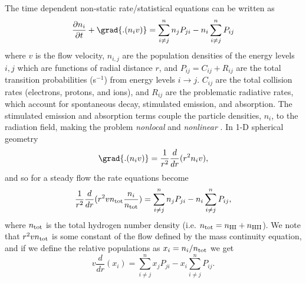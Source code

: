 The time dependent non-static rate/statistical equations can be written as
\begin{equation}
\frac{\partial n_{i}}{\partial t}+\grad{.(n_{i}v)} = \sum_{i\neq j}^n n_{j}P_{ji} - n_{i}\sum_{i\neq j}^n P_{ij} 
\end{equation}
where $v$ is the flow velocity, $n_{i,j}$ are the population densities of the energy levels $i,j$ which are functions of radial distance $r$, and  $P_{ij}=C_{ij}+R_{ij}$ are the total transition probabilities (s$^{-1}$) from energy levels $i \rightarrow j$. $C_{ij}$ are the total collision rates (electrons, protons, and ions), and $R_{ij}$ are the problematic radiative rates, which account for spontaneous decay, stimulated emission, and absorption. The stimulated emission and absorption terms couple the particle densities, $n_{i}$, to the radiation field, making the problem \textit{nonlocal} and \textit{nonlinear} \citep{scharmer_1985}. In 1-D spherical geometry
\begin{equation}
\grad{.(n_{i}v)} = \frac{1}{r^2}\frac{d}{dr}(r^2 n_{i}v),
\end{equation}
and so for a steady flow the rate equations become
\begin{equation}
\frac{1}{r^2}\frac{d}{dr}(r^2 vn_{\rm{tot}}\frac{n_{i}}{n_{\rm{tot}}}) = \sum_{i\neq j}^{n} n_{j}P_{ji} - n_{i}\sum_{i\neq j}^n P_{ij},
\end{equation}
where $n_{\rm{tot}}$ is the total hydrogen number density (i.e. $n_{\rm{tot}} = n_{\rm{HI}}+n_{\rm{HII}}$).
We note that $r^2 vn_{\rm{tot}}$ is some constant of the flow defined by the mass continuity equation, and if we define the relative populations as $x_{i}=n_{i}/n_{\rm{tot}}$ we get
\begin{equation}
v\frac{d}{dr}(x_{i}) = \sum_{i\neq j}^{n} x_{j}P_{ji} - x_{i}\sum_{i\neq j}^n P_{ij}.
\label{eq:eq6.9.1}
\end{equation}

